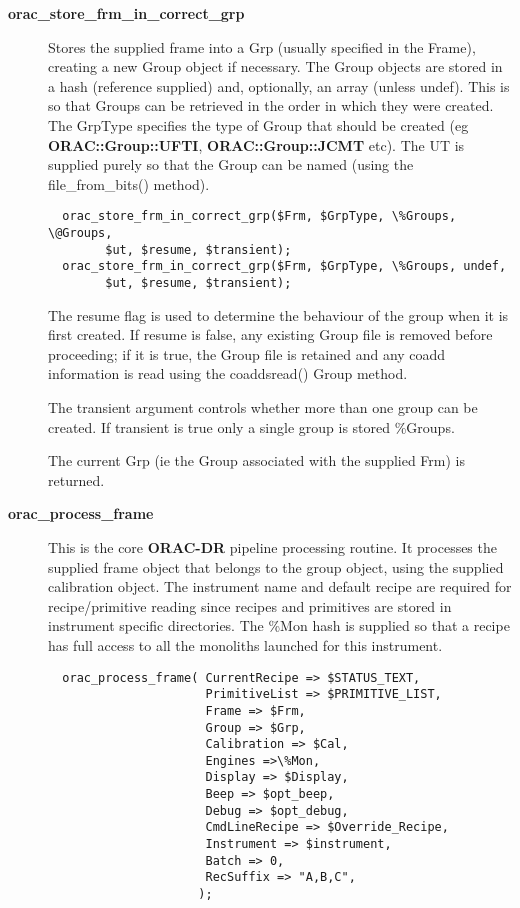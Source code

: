 \begin{description}

\item[{\textbf{orac\_store\_frm\_in\_correct\_grp}}] \mbox{}

Stores the supplied frame into a Grp (usually specified in the Frame),
creating a new Group object if necessary. The Group objects are stored
in a hash (reference supplied) and, optionally, an array (unless undef).
This is so that Groups can be retrieved in the order in which they
were created. The GrpType specifies the type of Group that should be
created (eg \textbf{ORAC::Group::UFTI}, \textbf{ORAC::Group::JCMT} etc). The UT
is supplied purely so that the Group can be named (using the
file\_from\_bits() method).

\begin{verbatim}
  orac_store_frm_in_correct_grp($Frm, $GrpType, \%Groups, \@Groups,
        $ut, $resume, $transient);
  orac_store_frm_in_correct_grp($Frm, $GrpType, \%Groups, undef,
        $ut, $resume, $transient);
\end{verbatim}


The resume flag is used to determine the behaviour of the group when
it is first created. If resume is false, any existing Group file is
removed before proceeding; if it is true, the Group file is retained
and any coadd information is read using the coaddsread() Group
method.



The transient argument controls whether more than one group can be
created. If transient is true only a single group is stored \%Groups.



The current Grp (ie the Group associated with the supplied Frm)
is returned.


\item[{\textbf{orac\_process\_frame}}] \mbox{}

This is the core \textbf{ORAC-DR} pipeline processing routine.
It processes the supplied frame object that belongs to the group object,
using the supplied calibration object. The instrument name and default
recipe are required for recipe/primitive reading since recipes and
primitives are stored in instrument specific directories.
The \%Mon hash is supplied so that a recipe has full access to
all the monoliths launched for this instrument.

\begin{verbatim}
  orac_process_frame( CurrentRecipe => $STATUS_TEXT,
                      PrimitiveList => $PRIMITIVE_LIST,
                      Frame => $Frm,
                      Group => $Grp,
                      Calibration => $Cal,
                      Engines =>\%Mon,
                      Display => $Display,
                      Beep => $opt_beep,
                      Debug => $opt_debug,
                      CmdLineRecipe => $Override_Recipe,
                      Instrument => $instrument,
                      Batch => 0,
                      RecSuffix => "A,B,C",
                     );
\end{verbatim}



\end{description}
